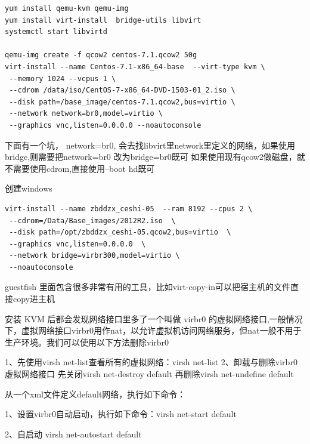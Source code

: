 \begin{lstlisting}
yum install qemu-kvm qemu-img
yum install virt-install  bridge-utils libvirt
systemctl start libvirtd

qemu-img create -f qcow2 centos-7.1.qcow2 50g
virt-install --name Centos-7.1-x86_64-base  --virt-type kvm \
 --memory 1024 --vcpus 1 \
 --cdrom /data/iso/CentOS-7-x86_64-DVD-1503-01_2.iso \
 --disk path=/base_image/centos-7.1.qcow2,bus=virtio \
 --network network=br0,model=virtio \
 --graphics vnc,listen=0.0.0.0 --noautoconsole
\end{lstlisting}

下面有一个坑， network=br0, 会去找libvirt里network里定义的网络，如果使用bridge,则需要把network=br0 改为bridge=br0既可
如果使用现有qcow2做磁盘，就不需要使用cdrom,直接使用--boot hd既可

创建windows
\begin{lstlisting}
virt-install --name zbddzx_ceshi-05  --ram 8192 --cpus 2 \
 --cdrom=/Data/Base_images/2012R2.iso  \
 --disk path=/opt/zbddzx_ceshi-05.qcow2,bus=virtio  \
 --graphics vnc,listen=0.0.0.0  \
 --network bridge=virbr300,model=virtio \
 --noautoconsole
\end{lstlisting}

guestfish 里面包含很多非常有用的工具，比如virt-copy-in可以把宿主机的文件直接copy进主机

安装 KVM 后都会发现网络接口里多了一个叫做 virbr0 的虚拟网络接口,一般情况下，虚拟网络接口virbr0用作nat，以允许虚拟机访问网络服务，但nat一般不用于生产环境。我们可以使用以下方法删除virbr0

1、先使用virsh net-list查看所有的虚拟网络：virsh net-list 
2、卸载与删除virbr0虚拟网络接口 先关闭virsh net-destroy default  再删除virsh net-undefine default

从一个xml文件定义default网络，执行如下命令： 

1、设置virbr0自动启动，执行如下命令：virsh net-start default           

2、自启动 virsh net-autostart default    


